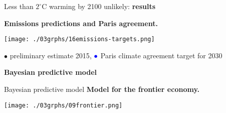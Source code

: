 \documentclass[notes,blackandwhite,mathsans,usenames,dvipsnames]{beamer}
\begin{document}
\begin{frame}{Less than $2^{\circ}$C warming by 2100 unlikely: \textbf{results}}

\bigskip\textbf{Emissions predictions and Paris agreement.}
\begin{center}
\texttt{[image: ./03grphs/16emissions-targets.png]}

\scriptsize
{\color{black}$\bullet$ preliminary estimate 2015}, $\color{blue}\bullet$ Paris climate agreement target for 2030
\end{center}
\end{frame}













{
\begin{frame}

\begin{adjustwidth}{-0.5cm}{0cm}
\vspace{8.3cm}\Large
\textbf{{\color{yel}Bayesian} {\color{blu}predictive model}}
\end{adjustwidth}

\end{frame}
}




\begin{frame}{Bayesian predictive model}
\textbf{Model for the frontier economy.}
\begin{center}
\texttt{[image: ./03grphs/09frontier.png]}
\end{center}
\end{frame}
\end{document}

